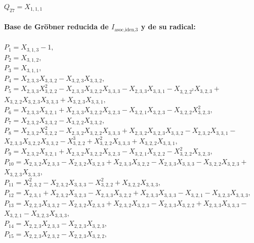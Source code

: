 \documentclass[10pt]{beamer}
\begin{document}
$Q_{27}=X_{1,1,1}$\\
\\
\textbf{Base de Gr\"obner reducida de $I_{\text{asoc,iden,}3}$ y de su radical:}\\
\\
$P_{1}=X_{3,1,3}-1,$\\
$P_{2}=X_{3,1,2},$\\
$P_{3}=X_{3,1,1},$\\
$P_{4}=X_{2,3,3}X_{3,3,2}-X_{3,2,3}X_{3,3,2},$\\
$P_{5}=X_{2,3,3}X_{3,2,2}^2-X_{2,3,3}X_{3,2,2}X_{3,3,3}-X_{2,3,3}X_{3,3,1}-X_{3,2,2^2}X_{3,2,3}+$\\
$X_{3,2,2}X_{3,2,3}X_{3,3,3}+X_{3,2,3}X_{3,3,1},$\\
$P_{6}=X_{2,3,3}X_{3,2,1}+X_{2,3,3}X_{3,2,2}X_{3,2,3}-X_{3,2,1}X_{3,2,3}-X_{3,2,2}X_{3,2,3}^2,$\\
$P_{7}=X_{2,3,2}X_{3,3,2}-X_{3,2,2}X_{3,3,2},$\\
$P_{8}=X_{2,3,2}X_{3,2,2}^2-X_{2,3,2}X_{3,2,2}X_{3,3,3}+X_{2,3,2}X_{3,2,3}X_{3,3,2}-X_{2,3,2}X_{3,3,1}-$\\
$X_{2,3,3}X_{3,2,2}X_{3,3,2}-X_{3,2,2}^3+X_{3,2,2}^2X_{3,3,3}+X_{3,2,2}X_{3,3,1},$\\
$P_{9}=X_{2,3,2}X_{3,2,1}+X_{2,3,2}X_{3,2,2}X_{3,2,3}-X_{3,2,1}X_{3,2,2}-X_{3,2,2}^2X_{3,2,3},$\\
$P_{10}=X_{2,3,2}X_{2,3,3}-X_{2,3,2}X_{3,2,3}+X_{2,3,3}X_{3,2,2}-X_{2,3,3}X_{3,3,3}-X_{3,2,2}X_{3,2,3}+$\\
$X_{3,2,3}X_{3,3,3},$\\
$P_{11}=X_{2,3,2}^2-X_{2,3,2}X_{3,3,3}-X_{3,2,2}^2+X_{3,2,2}X_{3,3,3},$\\
$P_{12}=X_{2,3,1}+X_{2,3,2}X_{3,2,3}-X_{2,3,3}X_{3,2,2}+X_{2,3,3}X_{3,3,3}-X_{3,2,1}-X_{3,2,3}X_{3,3,3},$\\
$P_{13}=X_{2,2,3}X_{3,3,2}-X_{2,3,2}X_{2,3,3}+X_{2,3,2}X_{3,2,3}-X_{2,3,3}X_{3,2,2}+X_{2,3,3}X_{3,3,3}-$\\
$X_{3,2,1}-X_{3,2,3}X_{3,3,3},$\\
$P_{14}=X_{2,2,3}X_{2,3,3}-X_{2,2,3}X_{3,2,3},$\\
$P_{15}=X_{2,2,3}X_{2,3,2}-X_{2,2,3}X_{3,2,2},$\\
\end{document}
